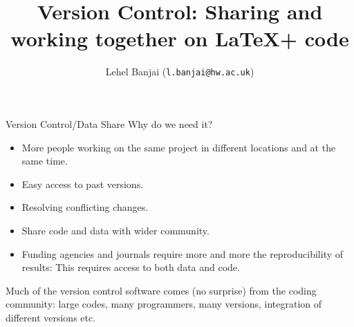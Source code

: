 \documentclass{beamer}
\title[MAC-MIGS Induction: Collaboration]{Version Control: Sharing and working together  on \LaTeX + code}
\author[L. Banjai]{ Lehel Banjai (\texttt{l.banjai@hw.ac.uk})}
\begin{document}
\frame{\titlepage
}

\begin{frame}{Version Control/Data Share}
  Why do we need it?

  \begin{itemize}
  \item More people working on the same project in different locations  and at the same time.
   \item Easy access to past versions.
\item Resolving conflicting changes.
    \item Share code and data with wider community.
    \item Funding agencies and journals require more and more the reproducibility of results: This requires access to both data and code.
  \end{itemize}\pause

  \begin{block}{}
Much of the version control software comes (no surprise) from the coding community: large codes, many programmers, many versions, integration of different versions etc.   
  \end{block}
\end{frame}
\end{document}
